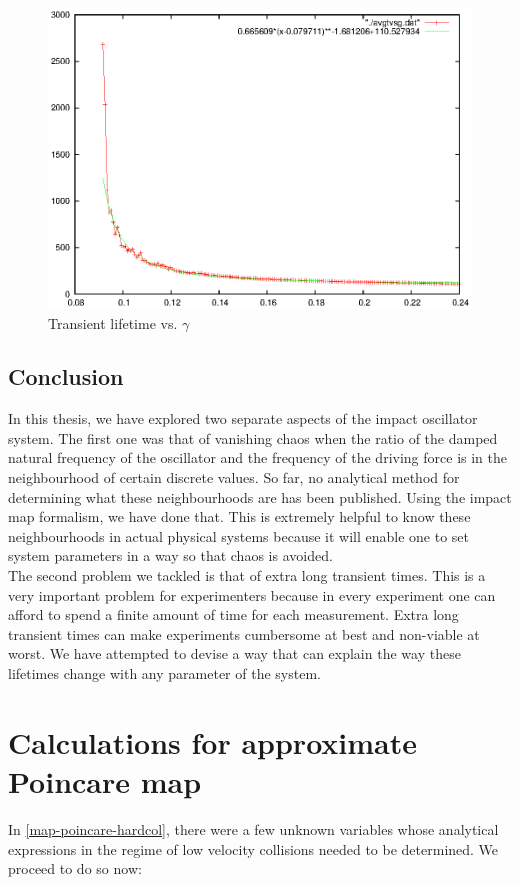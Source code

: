 \documentclass{book}
\renewcommand{\(}{\begin{columns}}
\renewcommand{\)}{\end{columns}}
\newcommand{\<}[1]{\begin{column}{#1}}
\renewcommand{\>}{\end{column}}
\begin{document}
\begin{figure}
\caption{Transient lifetime vs.  $\gamma$}
\begin{center}
\includegraphics[width=0.8\columnwidth]{trans_life_vsg_matches_somewhat}
\end{center}
\end{figure}


\section{Conclusion}
In this thesis, we have explored two separate aspects of the impact oscillator 
system.  The first one was that of vanishing chaos when the ratio of the 
damped natural frequency of the oscillator and the frequency of the driving 
force is in the neighbourhood of certain discrete values.  So far, no 
analytical method 
for determining what these neighbourhoods are has been published. Using the 
	impact map formalism, we have done that.  This is extremely helpful
to know these neighbourhoods in actual physical systems because it will enable 
one to set system parameters in a way so that chaos is avoided.  \\

The second problem we tackled is that of extra long transient times.  This is 
a very important problem for experimenters because in every experiment one can 
afford to spend a finite amount of time for each measurement.  Extra long 
transient times can make experiments cumbersome at best and non-viable at 
worst.  We have attempted to devise a way that can explain the way these lifetimes change with any 
parameter of the system.  



\appendix
\chapter{Calculations for approximate Poincare map}
In \eqref{map-poincare-hardcol}, there were a few unknown variables whose 
analytical expressions in the regime of low velocity collisions 
needed to be determined.  We proceed to do so now:
\end{document}
